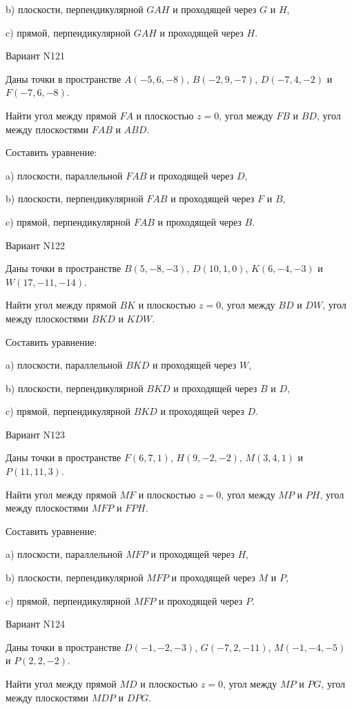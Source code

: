 \documentclass[11pt]{report}
\begin{document}
b) плоскости, перпендикулярной $GAH$ и проходящей через $G$ и $H$,

c) прямой, перпендикулярной $GAH$ и проходящей через $H$.

Вариант N121

Даны точки в пространстве
$A(-5, 6, -8)$, $B(-2, 9, -7)$, $D(-7, 4, -2)$ и
$F(-7, 6, -8)$.

Найти угол между прямой $FA$ и плоскостью $z = 0$, угол между $FB$ и $BD$, угол между плоскостями $FAB$ 
и $ABD$.

Составить уравнение: 

a) плоскости, параллельной $FAB$ и проходящей через $D$,

b) плоскости, перпендикулярной $FAB$ и проходящей через $F$ и $B$,

c) прямой, перпендикулярной $FAB$ и проходящей через $B$.

Вариант N122

Даны точки в пространстве
$B(5, -8, -3)$, $D(10, 1, 0)$, $K(6, -4, -3)$ и
$W(17, -11, -14)$.

Найти угол между прямой $BK$ и плоскостью $z = 0$, угол между $BD$ и $DW$, угол между плоскостями $BKD$ 
и $KDW$.

Составить уравнение: 

a) плоскости, параллельной $BKD$ и проходящей через $W$,

b) плоскости, перпендикулярной $BKD$ и проходящей через $B$ и $D$,

c) прямой, перпендикулярной $BKD$ и проходящей через $D$.

Вариант N123

Даны точки в пространстве
$F(6, 7, 1)$, $H(9, -2, -2)$, $M(3, 4, 1)$ и
$P(11, 11, 3)$.

Найти угол между прямой $MF$ и плоскостью $z = 0$, угол между $MP$ и $PH$, угол между плоскостями $MFP$ 
и $FPH$.

Составить уравнение: 

a) плоскости, параллельной $MFP$ и проходящей через $H$,

b) плоскости, перпендикулярной $MFP$ и проходящей через $M$ и $P$,

c) прямой, перпендикулярной $MFP$ и проходящей через $P$.

Вариант N124

Даны точки в пространстве
$D(-1, -2, -3)$, $G(-7, 2, -11)$, $M(-1, -4, -5)$ и
$P(2, 2, -2)$.

Найти угол между прямой $MD$ и плоскостью $z = 0$, угол между $MP$ и $PG$, угол между плоскостями $MDP$ 
и $DPG$.
\end{document}
